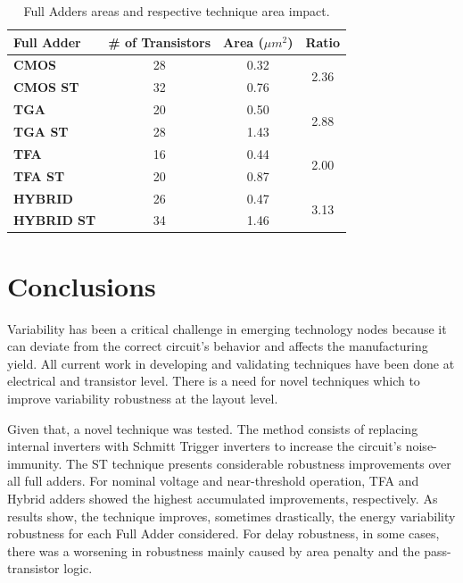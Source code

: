 \documentclass[ecp,tc, english]{iiufrgs}
\begin{document}
\begin{table}[H]
\centering
\caption{Full Adders areas and respective technique area impact.}
\label{penalties}
\begin{tabular}{lccc}
\hline
\textbf{Full Adder} & \multicolumn{1}{l}{\textbf{\# of Transistors}} & \textbf{Area (${\mu m}^2$)} & \textbf{Ratio}        \\ \hline
\textbf{CMOS}       & 28                                              & 0.32             & \multirow{2}{*}{2.36} \\ \cline{1-3}
\textbf{CMOS ST}    & 32                                              & 0.76             &                       \\ \hline
\textbf{TGA}        & 20                                              & 0.50             & \multirow{2}{*}{2.88} \\ \cline{1-3}
\textbf{TGA ST}     & 28                                              & 1.43             &                       \\ \hline
\textbf{TFA}        & 16                                              & 0.44             & \multirow{2}{*}{2.00} \\ \cline{1-3}
\textbf{TFA ST}     & 20                                              & 0.87             &                       \\ \hline
\textbf{HYBRID}     & 26                                              & 0.47             & \multirow{2}{*}{3.13} \\ \cline{1-3}
\textbf{HYBRID ST}  & 34                                              & 1.46             &                       \\ \hline
\end{tabular}
\end{table}

\chapter{Conclusions}

Variability has been a critical challenge in emerging technology nodes because it can deviate from the correct circuit's behavior and affects the manufacturing yield. All current work in developing and validating techniques have been done at electrical and transistor level. There is a need for novel techniques which to improve variability robustness at the layout level.

Given that, a novel technique was tested. The method consists of replacing internal inverters with Schmitt Trigger inverters to increase the circuit’s noise-immunity. The ST technique presents considerable robustness improvements over all full adders. For nominal voltage and near-threshold operation, TFA and Hybrid adders showed the highest accumulated improvements, respectively. As results show, the technique improves, sometimes drastically, the energy variability robustness for each Full Adder considered. For delay robustness, in some cases, there was a worsening in robustness mainly caused by area penalty and the pass-transistor logic. 
\end{document}

